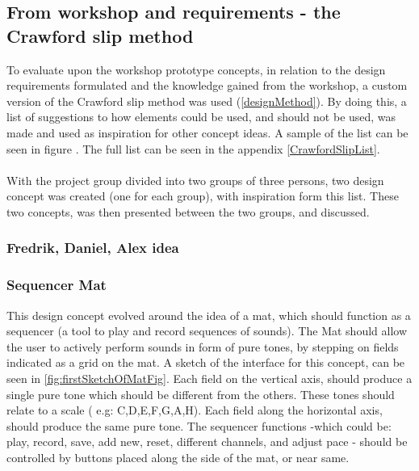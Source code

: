 \subsection{From workshop and requirements - the Crawford slip method}
To evaluate upon the workshop prototype concepts, in relation to the design requirements formulated and the knowledge gained from the workshop, a custom version of the Crawford slip method was used (\autoref{designMethod}). By doing this, a list of suggestions to how elements could be used, and should not be used, was made and used as inspiration for other concept ideas. A sample of the list can be seen in figure . The full list can be seen in the appendix \autoref{CrawfordSlipList}.  
\\\\


With the project group divided into two groups of three persons, two design concept was created (one for each group), with inspiration form this list. These two concepts, was then presented between the two groups, and discussed.  

\subsubsection{Fredrik, Daniel, Alex idea}

\subsubsection{Sequencer Mat}\label{sequencerMat}
This design concept evolved around the idea of a mat, which should function as a sequencer (a tool to play and record sequences of sounds). The Mat should allow the user to actively perform sounds in form of pure tones, by stepping on fields indicated as a grid on the mat. A sketch of the interface for this concept, can be seen in \autoref{fig:firstSketchOfMatFig}. Each field on the vertical axis, should produce a single pure tone which should be different from the others. These tones should relate to a scale ( e.g:  C,D,E,F,G,A,H). Each field along the horizontal axis, should produce the same pure tone. The sequencer functions -which could be: play, record, save, add new, reset, different channels, and adjust pace - should be controlled by buttons placed along the side of the mat, or near same.     


